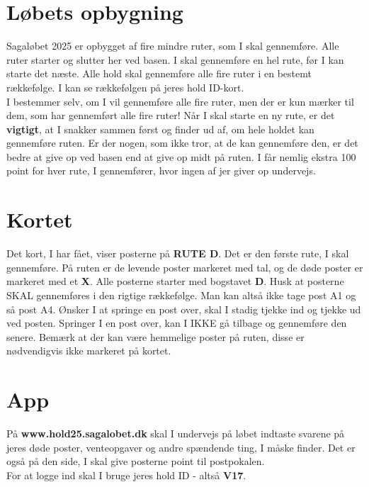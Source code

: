 \section{Løbets opbygning}
Sagaløbet 2025 er opbygget af fire mindre ruter, som I skal gennemføre. Alle ruter starter og slutter her ved basen. I skal gennemføre en hel rute, før I kan starte det næste. Alle hold skal gennemføre alle fire ruter i en bestemt rækkefølge. I kan se rækkefølgen på jeres hold ID-kort.\\\newline
I bestemmer selv, om I vil gennemføre alle fire ruter, men der er kun mærker til dem, som har gennemført alle fire ruter! Når I skal starte en ny rute, er det \textbf{vigtigt}, at I snakker sammen først og finder ud af, om hele holdet kan gennemføre ruten. Er der nogen, som ikke tror, at de kan gennemføre den, er det bedre at give op ved basen end at give op midt på ruten. I får nemlig ekstra 100 point for hver rute, I gennemfører, hvor ingen af jer giver op undervejs.\\
\section{Kortet}
Det kort, I har fået, viser posterne på \textbf{RUTE D}. Det er den første rute, I skal gennemføre. På ruten er de levende poster markeret med tal, og de døde poster er markeret med et \textbf{X}. Alle posterne starter med bogstavet \textbf{D}. Husk at posterne SKAL gennemføres i den rigtige rækkefølge. Man kan altså ikke tage post A1 og så post A4. Ønsker I at springe en post over, skal I stadig tjekke ind og tjekke ud ved posten. Springer I en post over, kan I IKKE gå tilbage og gennemføre den senere. Bemærk at der kan være hemmelige poster på ruten, disse er nødvendigvis ikke markeret på kortet.
\section{App}
På \textbf{www.hold25.sagalobet.dk} skal I undervejs på løbet indtaste svarene på jeres døde poster, venteopgaver og andre spændende ting, I måske finder. Det er også på den side, I skal give posterne point til postpokalen.\\
For at logge ind skal I bruge jeres hold ID - altså \textbf{V17}.
\newpage
